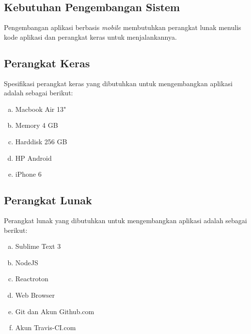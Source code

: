 \begin{spacing}{2}
\section{Kebutuhan Pengembangan Sistem}
	Pengembangan aplikasi berbasis \emph{mobile} membutuhkan perangkat lunak menulis kode aplikasi dan perangkat keras untuk menjalankannya.

	\subsection{Perangkat Keras}
		Spesifikasi perangkat keras yang dibutuhkan untuk mengembangkan aplikasi adalah sebagai berikut:

		\vspace{-0.5cm}

		\begin{enumerate}[a.]
		\itemsep0em
			\item Macbook Air 13"
			\item Memory 4 GB
			\item Harddisk 256 GB
			\item HP Android
			\item iPhone 6
		\end{enumerate}

	\subsection{Perangkat Lunak}
		Perangkat lunak yang dibutuhkan untuk mengembangkan aplikasi adalah sebagai berikut:

		\vspace{-0.5cm}

		\begin{enumerate}[a.]
		\itemsep0em
			\item Sublime Text 3
			\item NodeJS
			\item Reactroton
			\item Web Browser
			\item Git dan Akun Github.com
			\item Akun Travis-CI.com
		\end{enumerate}

\end{spacing}

